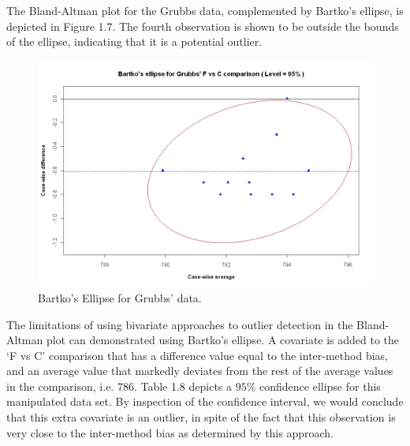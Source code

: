 \documentclass[Main.tex]{subfiles}
\begin{document}
	
	
	The Bland-Altman plot for the Grubbs data, complemented by Bartko's ellipse, is depicted in Figure 1.7.
	The fourth observation is shown to be outside the bounds of the ellipse, indicating that it is a potential outlier.
	
	
	\begin{figure}[h!]
		\includegraphics[width=130mm]{images/GrubbsBartko.jpeg}
		\caption{Bartko's Ellipse for Grubbs' data.}\label{GrubbsBartko}
	\end{figure}
	
	The limitations of using bivariate approaches to outlier detection
	in the Bland-Altman plot can demonstrated using Bartko's ellipse.
	A covariate is added to the `F vs C' comparison that has a
	difference value equal to the inter-method bias, and an average
	value that markedly deviates from the rest of the average values
	in the comparison, i.e. 786. Table 1.8 depicts a $95\%$ confidence
	ellipse for this manipulated data set. By inspection of the
	confidence interval, we would conclude that this extra
	covariate is an outlier, in spite of the fact that this
	observation is very close to the inter-method bias as determined by this approach.
	
\end{document}
